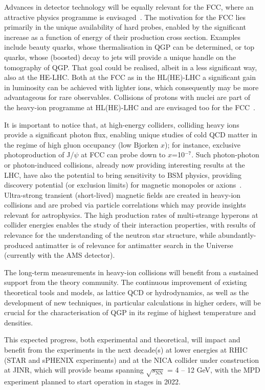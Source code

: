 Advances in detector technology will be equally relevant for the FCC, where an attractive physics programme is envisaged~\cite{Dainese:2016gch}. The motivation for the FCC lies primarily in the unique availability of hard probes, enabled by the significant increase as a function of energy of their production cross section. Examples include beauty quarks, whose thermalisation in QGP can be determined, or top quarks, whose (boosted) decay to jets will provide a unique handle on the tomography of QGP. That goal could be realised, albeit in a less significant way, also at the HE-LHC.
Both at the FCC as in the HL(HE)-LHC a significant gain in luminosity can be achieved with lighter ions, which consequently may be more advantageous for rare observables. Collisions of protons with nuclei are part of the heavy-ion programme at HL(HE)-LHC and are envisaged too for the FCC~\cite{Abada:2019lih}.

It is important to notice that, at high-energy colliders, colliding heavy ions provide a significant photon flux, enabling unique studies of cold QCD matter in the regime of high gluon occupancy (low Bjorken $x$); for instance, exclusive photoproduction of J/$\psi$ at FCC can probe down to $x$=10$^{-7}$.
Such photon-photon or photon-induced collisions, already now providing interesting results at the LHC, have also the potential to bring sensitivity to BSM physics, providing discovery  potential (or exclusion limits) for magnetic monopoles or axions~\cite{Bruce:2018yzs}.
Ultra-strong transient (short-lived) magnetic fields are created in heavy-ion collisions and are probed via particle correlations which may provide insights relevant for astrophysics.
The high production rates of multi-strange hyperons at collider energies enables the study of their interaction properties, with results of relevance for the understanding of the neutron star structure, while abundantly-produced antimatter is of relevance for antimatter search in the Universe (currently with the AMS detector).

The long-term measurements in heavy-ion collisions will benefit from a sustained support from the theory community. The continuous improvement of existing theoretical tools and models, as lattice QCD or hydrodynamics, as well as the development of new techniques, in particular calculations in higher orders, will be crucial for the characterisation of QGP in its regime of highest temperature and densities.

This expected progress, both experimental and theoretical, will impact and benefit from the experiments in the next decade(s) at lower energies at RHIC (STAR and sPHENIX experiments) and at the NICA collider under construction at JINR, which will provide beams spanning $\sqrt{s_{\mathrm{NN}}}$ = 4 -- 12 GeV, with the MPD experiment planned to start operation in stages in 2022.

